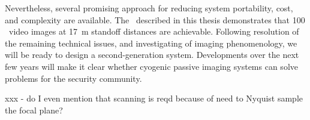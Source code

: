 Nevertheless, several promising approach for reducing system portability, cost, and complexity are available.
The \Imager\ described in this thesis demonstrates that \SI{100}{\mK} \NETD\ video images at \SI{17}{\m} standoff distances are achievable.
Following resolution of the remaining technical issues, and investigating of imaging phenomenology, we will be ready to design a second-generation system.
Developments over the next few years will make it clear whether cyogenic passive imaging systems can solve problems for the security community.

xxx - do I even mention that scanning is reqd because of need to Nyquist sample the focal plane? 




